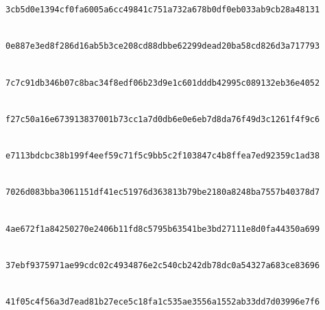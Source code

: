 \documentclass[pdflatex,sn-mathphys-num]{sn-jnl}%
\theoremstyle{thmstyleone}%
\theoremstyle{thmstyletwo}%
\theoremstyle{thmstylethree}%
\begin{document}
\begin{landscape}
\texttt{3cb5d0e1\allowbreak{}394cf0fa\allowbreak{}6005a6cc\allowbreak{}49841c75\allowbreak{}1a732a67\allowbreak{}8b0df0eb\allowbreak{}033ab9cb\allowbreak{}28a48131}\par
\noindent{}\\
\texttt{0e887e3e\allowbreak{}d8f286d1\allowbreak{}6ab5b3ce\allowbreak{}208cd88d\allowbreak{}bbe62299\allowbreak{}dead20ba\allowbreak{}58cd826d\allowbreak{}3a717793}\par
\noindent{}\\
\texttt{7c7c91db\allowbreak{}346b07c8\allowbreak{}bac34f8e\allowbreak{}df06b23d\allowbreak{}9e1c601d\allowbreak{}ddb42995\allowbreak{}c089132e\allowbreak{}b36e4052}\par
\noindent{}\\
\texttt{f27c50a1\allowbreak{}6e673913\allowbreak{}837001b7\allowbreak{}3cc1a7d0\allowbreak{}db6e0e6e\allowbreak{}b7d8da76\allowbreak{}f49d3c12\allowbreak{}61f4f9c6}\par
\noindent{}\\
\texttt{e7113bdc\allowbreak{}bc38b199\allowbreak{}f4eef59c\allowbreak{}71f5c9bb\allowbreak{}5c2f1038\allowbreak{}47c4b8ff\allowbreak{}ea7ed923\allowbreak{}59c1ad38}\par
\noindent{}\\
\texttt{7026d083\allowbreak{}bba30611\allowbreak{}51df41ec\allowbreak{}51976d36\allowbreak{}3813b79b\allowbreak{}e2180a82\allowbreak{}48ba7557\allowbreak{}b40378d7}\par
\noindent{}\\
\texttt{4ae672f1\allowbreak{}a8425027\allowbreak{}0e2406b1\allowbreak{}1fd8c579\allowbreak{}5b63541b\allowbreak{}e3bd2711\allowbreak{}1e8d0fa4\allowbreak{}4350a699}\par
\noindent{}\\
\texttt{37ebf937\allowbreak{}5971ae99\allowbreak{}cdc02c49\allowbreak{}34876e2c\allowbreak{}540cb242\allowbreak{}db78dc0a\allowbreak{}54327a68\allowbreak{}3ce83696}\par
\noindent{}\\
\texttt{41f05c4f\allowbreak{}56a3d7ea\allowbreak{}d81b27ec\allowbreak{}e5c18fa1\allowbreak{}c535ae35\allowbreak{}56a1552a\allowbreak{}b33dd7d0\allowbreak{}3996e7f6}\par

\end{landscape}
\end{document}
